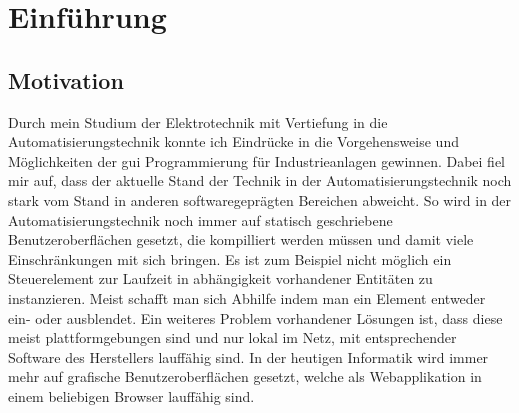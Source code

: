 \chapter{Einführung}
\section{Motivation}
Durch mein Studium der Elektrotechnik mit Vertiefung in die Automatisierungstechnik konnte ich Eindrücke in die Vorgehensweise und 
Möglichkeiten der \ac{gui} Programmierung für Industrieanlagen gewinnen. %
Dabei fiel mir auf, dass der aktuelle Stand der Technik in  der Automatisierungstechnik noch stark 
vom Stand in anderen softwaregeprägten Bereichen abweicht.
So wird in der Automatisierungstechnik noch immer auf statisch geschriebene Benutzeroberflächen gesetzt, 
die kompilliert werden müssen und damit viele Einschränkungen mit sich bringen.
Es ist zum Beispiel nicht möglich ein Steuerelement zur Laufzeit in abhängigkeit vorhandener Entitäten zu instanzieren. 
Meist schafft man sich Abhilfe indem man ein Element entweder ein- oder ausblendet.
Ein weiteres Problem vorhandener Lösungen ist, dass diese meist plattformgebungen sind und nur lokal im Netz, 
mit entsprechender Software des Herstellers lauffähig sind.
In der heutigen Informatik wird immer mehr auf grafische Benutzeroberflächen gesetzt, 
welche als Webapplikation in einem beliebigen Browser lauffähig sind.

